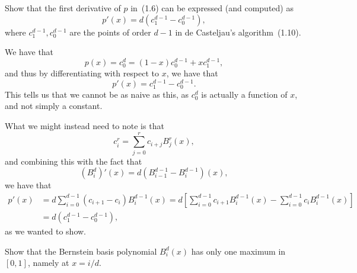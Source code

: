 \begin{exercise}
    Show that the first derivative of $p$ in~(1.6) can be expressed (and computed) as
    \begin{equation*}
        p'(x) = d(c_{1}^{d-1} - c_{0}^{d-1}),
    \end{equation*}
    where $c_{1}^{d-1}, c_{0}^{d-1}$ are the points of order $d-1$ in de Casteljau's algorithm~(1.10).
\end{exercise}

\begin{solution}
    We have that
    \begin{equation*}
        p(x) = c_0^d = (1 - x) c_0^{d-1} + x c_1^{d-1},
    \end{equation*}
    and thus by differentiating with respect to $x$, we have that
    \begin{equation*}
        p'(x) = c_1^{d-1} - c_0^{d-1}.
    \end{equation*}
    This tells us that we cannot be as naive as this, as $c_0^d$ is actually a function of $x$, and not simply a constant.

    What we might instead need to note is that
    \begin{equation*}
        c_i^r = \sum_{j = 0}^r c_{i+j} B_j^r(x),
    \end{equation*}
    and combining this with the fact that
    \begin{equation*}
        \left( B_i^d \right)'(x) = d \left( B_{i-1}^{d-1} - B_i^{d-1} \right)(x),
    \end{equation*}
    we have that
    \begin{align*}
        p'(x)
        &= d \sum_{i = 0}^{d-1} \left( c_{i+1} - c_i \right) B_i^{d-1}(x)
        = d \left[
            \sum_{i = 0}^{d-1} c_{i+1} B_i^{d-1}(x) - \sum_{i = 0}^{d-1} c_i B_i^{d-1}(x)
        \right] \\
        &= d(c_{1}^{d-1} - c_{0}^{d-1}),
    \end{align*}
    as we wanted to show.
\end{solution}

\begin{exercise}
    Show that the Bernstein basis polynomial $B_i^d(x)$ has only one maximum in $[0, 1]$, namely at $x = i/d$.
\end{exercise}

